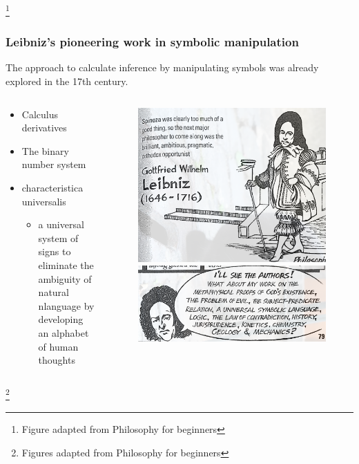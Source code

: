\documentclass[unicode, 14pt, aspectratio=169]{beamer}
\newcommand\blfootnote[1]{%
  \begingroup
  \renewcommand\thefootnote{}\footnote{#1}%
  \addtocounter{footnote}{-1}%
  \endgroup
}
\begin{document}
\begin{frame}
\begin{columns}
\begin{column}{0.2\textwidth}
\begin{figure}
      \end{figure}       
    \end{column} 
  \end{columns}
  \blfootnote{Figure adapted from Philosophy for beginners\supercite{philosophy-for-begginers}}
\end{frame}

\begin{frame}
  \frametitle{Leibniz's pioneering work in symbolic manipulation}
  {\large The approach to calculate inference by manipulating symbols was already explored in the 17th century.}  
  \begin{columns}
    \begin{column}{0.55\textwidth}
      {\setlength{\leftmargini}{0.05\paperwidth}
       \setlength{\leftmarginii}{16pt}
      \begin{itemize}
        \item Calculus derivatives
        \item The binary number system
        \item characteristica universalis
          \begin{itemize}
          \item a universal system of signs to eliminate the ambiguity of natural nlanguage by developing an alphabet of human thoughts
          \end{itemize}
        \end{itemize}
      }
    \end{column}    
    \begin{column}{0.4\textwidth}
      \begin{figure}
        \includegraphics[width=0.65\linewidth]{images/leibniz.png}
        \includegraphics[width=0.65\linewidth]{images/universal.png}
      \end{figure}
    \end{column} 
  \end{columns}
  \blfootnote{Figures adapted from Philosophy for beginners\supercite{philosophy-for-begginers}}  
\end{frame}
\end{document}
